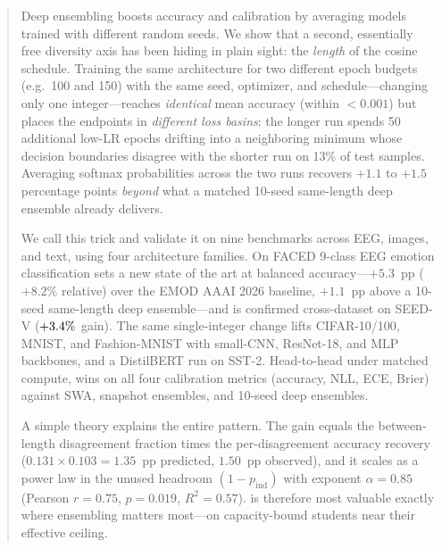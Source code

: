 \begin{abstract}
Deep ensembling boosts accuracy and calibration by averaging models trained
with different random seeds. We show that a second, essentially free
diversity axis has been hiding in plain sight: the \emph{length} of the
cosine schedule. Training the same architecture for two different epoch
budgets (e.g.\ 100 and 150) with the same seed, optimizer, and
schedule---changing only one integer---reaches \emph{identical} mean
accuracy (within $<\!0.001$) but places the endpoints in \emph{different
loss basins}: the longer run spends 50 additional low-LR epochs drifting
into a neighboring minimum whose decision boundaries disagree with the
shorter run on 13\% of test samples. Averaging softmax probabilities
across the two runs recovers $+1.1$ to $+1.5$ percentage points
\emph{beyond} what a matched 10-seed same-length deep ensemble already
delivers.

We call this trick \ours{} and validate it on nine benchmarks across EEG,
images, and text, using four architecture families. On FACED 9-class EEG
emotion classification \ours{} sets a new state of the art at
\facedacc{} balanced accuracy---$+5.3$~pp ($+8.2\%$ relative) over the
EMOD AAAI 2026 baseline, $+1.1$~pp above a 10-seed same-length deep
ensemble---and is confirmed cross-dataset on SEED-V ($\seedvgain{}$ gain).
The same single-integer change lifts CIFAR-10/100, MNIST, and
Fashion-MNIST with small-CNN, ResNet-18, and MLP backbones, and a
DistilBERT run on SST-2. Head-to-head under matched compute, \ours{} wins
on all four calibration metrics (accuracy, NLL, ECE, Brier) against SWA,
snapshot ensembles, and 10-seed deep ensembles.

A simple theory explains the entire pattern. The gain equals the
between-length disagreement fraction times the per-disagreement accuracy
recovery ($0.131 \times 0.103 = 1.35$~pp predicted, $1.50$~pp observed),
and it scales as a power law in the unused headroom $(1-p_{\mathrm{ind}})$
with exponent $\alpha=0.85$ (Pearson $r=0.75$, $p=0.019$, $R^2=0.57$).
\ours{} is therefore most valuable exactly where ensembling matters
most---on capacity-bound students near their effective ceiling.
\end{abstract}
